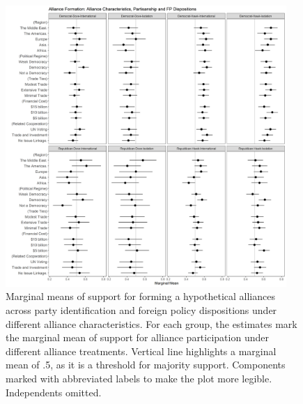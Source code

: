 \documentclass[12pt]{article}
\begin{document}
\begin{figure}
	\centering
		\includegraphics[width=0.95\textwidth]{../figures/party-dispo-form-char.png}
	\caption{Marginal means of support for forming a hypothetical alliances across party identification and foreign policy dispositions under different alliance characteristics. For each group, the estimates mark the marginal mean of support for alliance participation under different alliance treatments. Vertical line highlights a marginal mean of .5, as it is a threshold for majority support. Components marked with abbreviated labels to make the plot more legible. Independents omitted.}
	\label{fig:party-dispo-form-char}
\end{figure}
\end{document}
